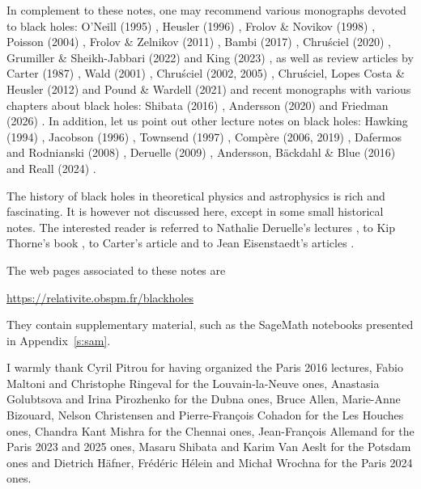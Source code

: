 \vspace{2ex}

In complement to these notes, one may recommend various monographs devoted to black holes:
O'Neill (1995) \cite{ONeil95}, Heusler (1996) \cite{Heusl96}, Frolov \& Novikov (1998) \cite{FroloN98},
Poisson (2004) \cite{Poiss04}, Frolov \& Zelnikov (2011) \cite{FroloZ11}, Bambi (2017) \cite{Bambi17},
Chru\'sciel (2020) \cite{Chrus20}, Grumiller \& Sheikh-Jabbari (2022) \cite{GrumiS22}
and King (2023) \cite{King23},
as well as review articles by
Carter (1987) \cite{Carte87}, Wald (2001) \cite{Wald01},
Chru\'sciel (2002, 2005) \cite{Chrus02, Chrus05}, Chru\'sciel, Lopes Costa \& Heusler (2012) \cite{ChrusLH12} and Pound \& Wardell (2021) \cite{PoundW21}
and recent monographs with various chapters about black holes:
Shibata (2016) \cite{Shiba16}, Andersson (2020) \cite{Ander20} and Friedman (2026) \cite{Fried26}.
In addition, let us point out other lecture notes on black holes:
Hawking (1994) \cite{Hawki94,HawkiP15}, Jacobson (1996) \cite{Jacob96}, Townsend (1997) \cite{Towns97},
Compère (2006, 2019) \cite{Compe06,Compe19}, Dafermos and Rodnianski (2008) \cite{DaferR13},
Deruelle (2009) \cite{Derue09}, Andersson, Bäckdahl \& Blue (2016) \cite{AnderBB18}
and Reall (2024) \cite{Reall24b}.

The history of black holes in theoretical physics and astrophysics is
rich and fascinating. It is however not discussed here, except in some
small historical notes. The interested
reader is referred to Nathalie Deruelle's lectures \cite{Derue09}, to Kip Thorne's
book \cite{Thorn94}, to Carter's article \cite{Carte06}
and to Jean Eisenstaedt's articles \cite{Eisen82,Eisen93}.


The web pages associated to these notes are
\begin{center}
\url{https://relativite.obspm.fr/blackholes}
\end{center}
They contain supplementary material, such as the SageMath notebooks presented in
Appendix~\ref{s:sam}.

\vspace{2ex}

I warmly thank Cyril Pitrou for having organized the Paris 2016 lectures,
Fabio Maltoni and Christophe Ringeval for the Louvain-la-Neuve ones,
Anastasia Golubtsova and Irina Pirozhenko for the Dubna ones,
Bruce Allen, Marie-Anne Bizouard, Nelson Christensen and Pierre-François Cohadon for the Les Houches ones,
Chandra Kant Mishra for the Chennai ones,
Jean-François Allemand for the Paris 2023 and 2025 ones, Masaru Shibata and Karim Van Aeslt for the Potsdam ones and Dietrich Häfner, Frédéric Hélein and Michał Wrochna for the Paris 2024 ones.

